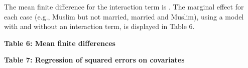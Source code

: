 \documentclass{article}
\begin{document}
The mean finite difference for the interaction term is . The marginal effect for each case (e.g., Muslim but not married, married and Muslim), using a model with and without an interaction term, is displayed in Table 6.

\begin{center}
        \textbf{Table 6: Mean finite differences} \\\medskip
        
\end{center}
\begin{center}
        \textbf{Table 7: Regression of squared errors on covariates} \\\medskip
        
\end{center}
\end{document}
